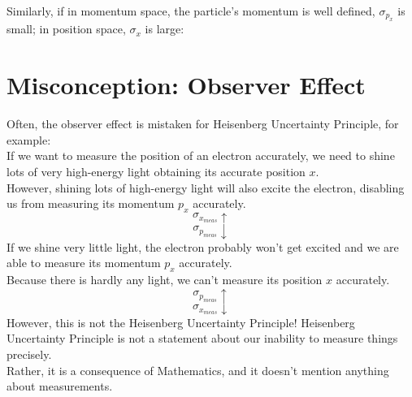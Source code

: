 \documentclass[hidelinks, a4paper, 12pt]{article}
\newcommand{\n}{\\[\baselineskip]}
\begin{document}
        Similarly, if in momentum space, the particle's momentum is well defined, $\sigma_{p_{x}}$ is small; in position space, $\sigma_x$ is large:\n

    \section{Misconception: Observer Effect}
        Often, the observer effect is mistaken for Heisenberg Uncertainty Principle, for example:\n
        If we want to measure the position of an electron accurately, we need to shine lots of very high-energy light obtaining its accurate position $x$.\n
        However, shining lots of high-energy light will also excite the electron, disabling us from measuring its momentum $p_x$ accurately.
        \[\sigma_{x_{meas}} \uparrow\]
        \[\sigma_{p_{meas}} \downarrow\]
        If we shine very little light, the electron probably won't get excited and we are able to measure its momentum $p_x$ accurately.\n
        Because there is hardly any light, we can't measure its position $x$ accurately.
        \[\sigma_{p_{meas}} \uparrow\]
        \[\sigma_{x_{meas}} \downarrow\]
        However, this is not the Heisenberg Uncertainty Principle! Heisenberg Uncertainty Principle is not a statement about our inability to measure things precisely.\n
        Rather, it is a consequence of Mathematics, and it doesn't mention anything about measurements.
    
    
\end{document}
